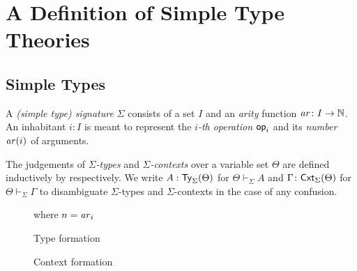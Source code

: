 \documentclass[acmsmall]{acmart}
\theoremstyle{acmdefinition}
\begin{document}
\section{A Definition of Simple Type Theories}\label{sec:simple-type-theories}
\subsection{Simple Types}
\begin{definition}
  A \emph{(simple type) signature} $\Sigma$ consists of a set $I$ and an \emph{arity} function $\mathit{ar}\colon I \to \mathbb{N}$.
  An inhabitant $i : I$ is meant to represent the \emph{$i$-th operation} $\mathsf{op}_i$ and its \emph{number} $ \mathit{ar}(i)$ of arguments.

  The judgements of \emph{$\Sigma$-types} and \emph{$\Sigma$-contexts} over a variable set $\Theta$ are defined inductively by  respectively.
We write $A : \mathsf{Ty}_{\Sigma}(\Theta)$ for $\Theta \vdash_{\Sigma} A$ and $\Gamma \colon \mathsf{Cxt}_{\Sigma}(\Theta)$ for $\Theta \vdash_{\Sigma} \Gamma$ to disambiguate $\Sigma$-types and $\Sigma$-contexts in the case of any confusion.
\end{definition}

\begin{figure}
  \begin{minipage}[b]{.55\textwidth}
    \centering
    \small
    where $n = \mathit{ar}_i$
    \caption{Type formation}
    \label{fig:simple-type}
  \end{minipage}
  \begin{minipage}[b]{.4\textwidth}
    \centering
    \small
    \caption{Context formation}
  \label{fig:simple-context}
  \end{minipage}
\end{figure}
\end{document}
